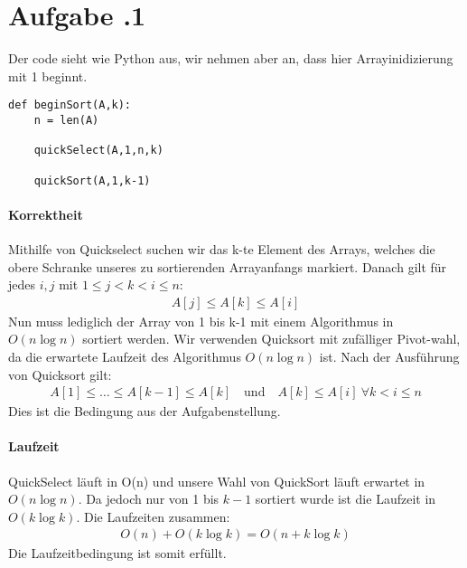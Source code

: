 \pagebreak
\section*{Aufgabe \bn.1}
Der code sieht wie Python aus, wir nehmen aber an, dass hier Arrayinidizierung mit 1 beginnt.
\begin{Verbatim}[frame=single, label=Arrayanfang sortieren]
  def beginSort(A,k):
    n = len(A)

    quickSelect(A,1,n,k)
    
    quickSort(A,1,k-1)
\end{Verbatim}
\paragraph*{Korrektheit} Mithilfe von Quickselect suchen wir das k-te Element des Arrays, welches die obere Schranke unseres zu sortierenden Arrayanfangs markiert. Danach gilt für jedes $i,j$ mit $ 1 \le j < k < i \le n $:
\begin{align*}
  A[j] \le A[k] \le A[i]
\end{align*}
Nun muss lediglich der Array von 1 bis k-1 mit einem Algorithmus in $ O(n\log n) $ sortiert werden. Wir verwenden Quicksort mit zufälliger Pivot-wahl, da die erwartete Laufzeit des Algorithmus $ O(n\log n) $ ist. Nach der Ausführung von Quicksort gilt:
\begin{align*}
  A[1] \le \dots \le A[k-1] \le A[k]\quad \text{und}\quad A[k]\le A[i]\ \forall k < i \le n
\end{align*}
Dies ist die Bedingung aus der Aufgabenstellung.
\paragraph*{Laufzeit} QuickSelect läuft in O(n) und unsere Wahl von QuickSort läuft erwartet in $O(n\log n)$. Da jedoch nur von 1 bis $k-1$ sortiert wurde ist die Laufzeit in $ O(k\log k) $. Die Laufzeiten zusammen:
\begin{align*}
  O(n) + O(k\log k) = O(n + k\log k)
\end{align*}
Die Laufzeitbedingung ist somit erfüllt.